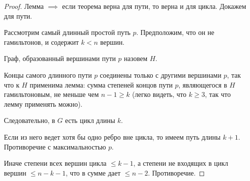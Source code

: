 \begin{proof}
    
    Лемма $\implies$ если теорема верна для пути, то верна и для цикла. Докажем для пути.

    Рассмотрим самый длинный простой путь $p$. Предположим, что он не гамильтонов, и содержит $k < n$ вершин.

    Граф, образованный вершинами пути $p$ назовем $H$.

    Концы самого длинного пути $p$ соединены только с другими вершинами $p$, так что к $H$ применима лемма: сумма степеней концов пути $p$, являющегося в $H$ гамильтоновым, не меньше чем $n - 1 \geq k$ (легко видеть, что $k \geq 3$, так что лемму применять можно).

    Следовательно, в $G$ есть цикл длины $k$.

    Если из него ведет хотя бы одно ребро вне цикла, то имеем путь длины $k + 1$. Противоречие с максимальностью $p$.

    Иначе степени всех вершин цикла $\leq k - 1$, а степени не входящих в цикл вершин $\leq n - k - 1$, что в сумме дает $\leq n - 2$. Противоречие.

\end{proof}